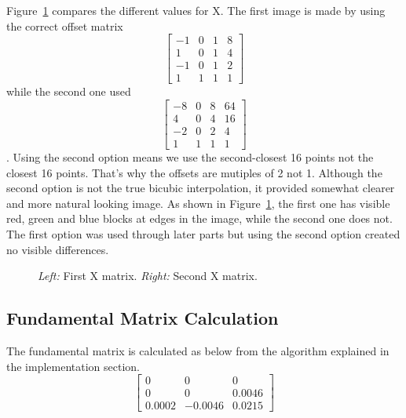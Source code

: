 Figure~\ref{fig:x_comparison} compares the different values for X. The first image is made by using the correct offset matrix
\[
\begin{bmatrix}
-1       & 0& 1&8 \\
1       & 0 & 1&4 \\
-1       & 0 & 1&2\\
1 & 1 & 1 & 1
\end{bmatrix}
\]
 while the second one used
 \[
 \begin{bmatrix}
 -8       & 0& 8&64 \\
 4       & 0 & 4&16 \\
 -2       & 0 & 2&4\\
 1 & 1 & 1 & 1
 \end{bmatrix}
 \]
 . Using the second option means we use the second-closest 16 points not the closest 16 points. That's why the offsets are mutiples of 2 not 1. Although the second option is not the true bicubic interpolation, it provided somewhat clearer and more natural looking image. As shown in Figure~\ref{fig:x_comparison}, the first one has visible red, green and blue blocks at edges in the image, while the second one does not. The first option was used through later parts but using the second option created no visible differences.

\begin{figure}[h]
    \centering
    \caption{\emph{Left:} First X matrix. \emph{Right:} Second X matrix.}
    \label{fig:x_comparison}
\end{figure}

\subsection{Fundamental Matrix Calculation}
The fundamental matrix is calculated as below from the algorithm explained in the implementation section.
\[
\begin{bmatrix}
0       & 0& 0 \\
0       & 0 & 0.0046 \\
0.0002       & -0.0046 & 0.0215
\end{bmatrix}
\]

